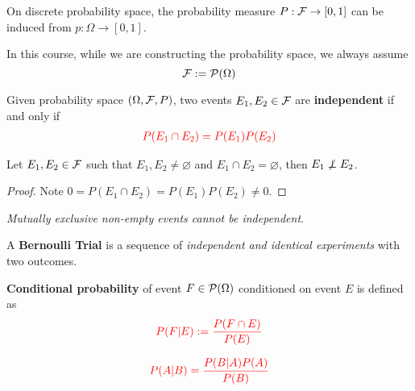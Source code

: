 \documentclass{article}
\begin{document}
		\begin{proposition}
			On discrete probability space, the probability measure $P: \mathcal{{F}} \to [0, 1]$ can be induced from $p: \Omega \to [0, 1]$.
		\end{proposition}
		
		\begin{assumption}
			In this course, while we are constructing the probability space, we always assume 
			\begin{equation}
				\mathcal{{F}} := \mathcal{{P}}(\Omega)
			\end{equation}
		\end{assumption}
		
		\begin{definition}
			Given probability space $(\Omega, \mathcal{{F}}, P)$, two events $E_1, E_2 \in \mathcal{{F}}$ are \textbf{independent} if and only if 
			\begin{gather}
				\textcolor{red}{P(E_1 \cap E_2) = P(E_1) P(E_2)}
			\end{gather}
		\end{definition}
		
		\begin{proposition}
			Let $E_1, E_2 \in \mathcal{{F}}$ such that $E_1, E_2 \neq \varnothing$ and $E_1 \cap E_2 = \varnothing$, then $E_1 \centernot \perp E_2$.
			\begin{proof}
				Note $0 = P(E_1 \cap E_2) = P(E_1)P(E_2) \neq 0$.
			\end{proof}
			\emph{Mutually exclusive non-empty events cannot be independent}.
		\end{proposition}
		
		\begin{definition}
			A \textbf{Bernoulli Trial} is a sequence of \emph{independent and identical experiments} with two outcomes.
		\end{definition}
		
		\begin{definition}
			\textbf{Conditional probability} of event $F \in \mathcal{{P}}(\Omega)$ conditioned on event $E$ is defined as 
			\begin{equation}
				\textcolor{red}{P(F|E) := \frac{P(F \cap E)}{P(E)}}
			\end{equation}
		\end{definition}
		
		\begin{theorem}
			\begin{equation}
				\textcolor{red}{P(A|B) = \frac{P(B|A)P(A)}{P(B)}}
			\end{equation}
		\end{theorem}
		
\end{document}
